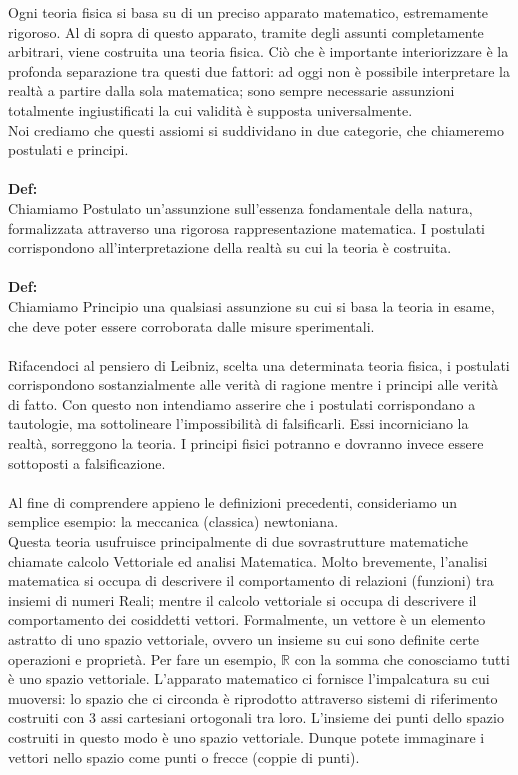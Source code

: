 \documentclass[]{article}
\begin{document}
	Ogni teoria fisica si basa su di un preciso apparato matematico, estremamente rigoroso. Al di sopra di questo apparato, tramite degli assunti completamente arbitrari, viene costruita una teoria fisica. Ciò che è importante interiorizzare è la profonda separazione tra questi due fattori: ad oggi non è possibile interpretare la realtà a partire dalla sola matematica; sono sempre necessarie assunzioni totalmente ingiustificati la cui validità è supposta universalmente.\\
	Noi crediamo che questi assiomi si suddividano in due categorie, che chiameremo postulati e principi.\\
	\\
	\textbf{Def:}\\
	Chiamiamo Postulato un'assunzione sull'essenza fondamentale della natura, formalizzata attraverso una rigorosa rappresentazione matematica. I postulati corrispondono all'interpretazione della realtà su cui la teoria è costruita.
	\\
	\\
	\textbf{Def:}\\
	Chiamiamo Principio una qualsiasi assunzione su cui si basa la teoria in esame, che deve poter essere corroborata dalle misure sperimentali.
	\\
	\\
	Rifacendoci al pensiero di Leibniz, scelta una determinata teoria fisica, i postulati corrispondono sostanzialmente alle verità di ragione mentre i principi alle verità di fatto. Con questo non intendiamo asserire che i postulati corrispondano a tautologie, ma sottolineare l'impossibilità di falsificarli. Essi incorniciano la realtà, sorreggono la teoria. I principi fisici potranno e dovranno invece essere sottoposti a falsificazione.\\
	\\
	Al fine di comprendere appieno le definizioni precedenti, consideriamo un semplice esempio: la meccanica (classica) newtoniana.\\
	Questa teoria usufruisce principalmente di due sovrastrutture matematiche chiamate calcolo Vettoriale ed analisi Matematica. Molto brevemente, l'analisi matematica si occupa di descrivere il comportamento di relazioni (funzioni) tra insiemi di numeri Reali; mentre il calcolo vettoriale si occupa di descrivere il comportamento dei cosiddetti vettori. Formalmente, un vettore è un elemento astratto di uno spazio vettoriale, ovvero un insieme su cui sono definite certe operazioni e proprietà. Per fare un esempio, $\mathbb{R}$ con la somma che conosciamo tutti è uno spazio vettoriale. L'apparato matematico ci fornisce l'impalcatura su cui muoversi: lo spazio che ci circonda è riprodotto attraverso sistemi di riferimento costruiti con 3 assi cartesiani ortogonali tra loro. L'insieme dei punti dello spazio costruiti in questo modo è uno spazio vettoriale. Dunque potete immaginare i vettori nello spazio come punti o frecce (coppie di punti). \\
\end{document}
